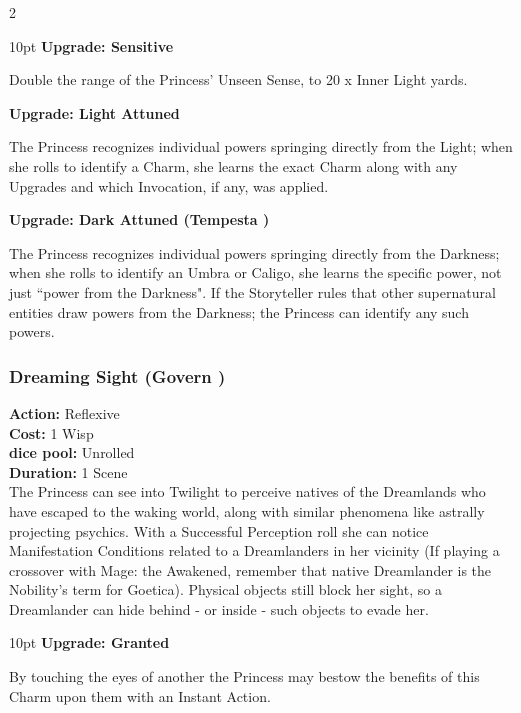 \begin{multicols}{2}
\begin{myindentpar}{10pt} \textbf{Upgrade: Sensitive}

Double the range of the Princess' Unseen Sense, to 20 x Inner Light yards.

\textbf{Upgrade: Light Attuned}

The Princess recognizes individual powers springing directly from the Light; when she rolls to identify a Charm, she learns the exact Charm along with any Upgrades and which Invocation, if any, was applied. 

\textbf{Upgrade: Dark Attuned (Tempesta \textbullet)}

The Princess recognizes individual powers springing directly from the Darkness; when she rolls to identify an Umbra or Caligo, she learns the specific power, not just \textquotedblleft power from the Darkness". If the Storyteller rules that other supernatural entities draw powers from the Darkness; the Princess can identify any such powers.\end{myindentpar}


\subsubsection*{Dreaming Sight (Govern \textbullet)}

\noindent \textbf{Action:} Reflexive\\ 

\noindent \textbf{Cost:} 1 Wisp\\ 

\noindent \textbf{dice pool:} Unrolled\\ 

\noindent \textbf{Duration:} 1 Scene\\ 

\noindent The Princess can see into Twilight to perceive natives of the Dreamlands who have escaped to the waking world, along with similar phenomena like astrally projecting psychics. With a Successful Perception roll she can notice Manifestation Conditions related to a Dreamlanders in her vicinity (If playing a crossover with Mage: the Awakened, remember that native Dreamlander is the Nobility's term for Goetica). Physical objects still block her sight, so a Dreamlander can hide behind - or inside - such objects to evade her.	

\begin{myindentpar}{10pt} \textbf{Upgrade: Granted}

By touching the eyes of another the Princess may bestow the benefits of this Charm upon them with an Instant Action. 


\end{myindentpar}
\end{multicols}
